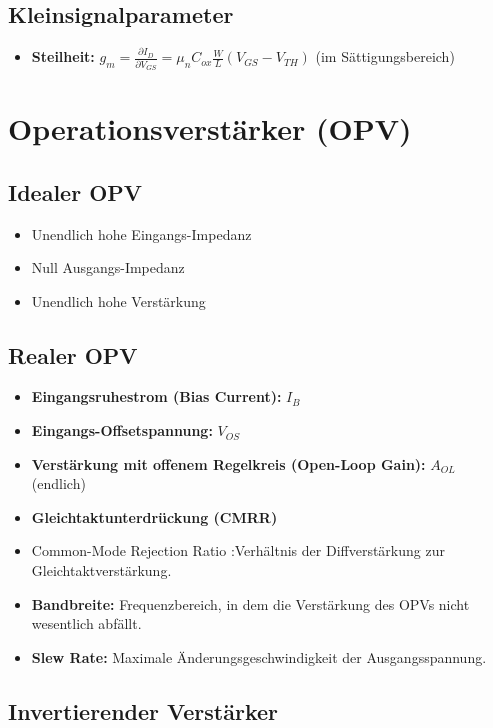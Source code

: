 \documentclass{article}
\begin{document}
\subsection*{Kleinsignalparameter}
\begin{itemize}
    \item \textbf{Steilheit:} $g_m = \frac{\partial I_D}{\partial V_{GS}} = \mu_n C_{ox} \frac{W}{L} (V_{GS} - V_{TH})$ (im Sättigungsbereich)
\end{itemize}

\section*{Operationsverstärker (OPV)}

\subsection*{Idealer OPV}
\begin{itemize}
    \item Unendlich hohe Eingangs-Impedanz
    \item Null Ausgangs-Impedanz
    \item Unendlich hohe Verstärkung
\end{itemize}

\subsection*{Realer OPV}
\begin{itemize}
    \item \textbf{Eingangsruhestrom (Bias Current):} $I_B$
    \item \textbf{Eingangs-Offsetspannung:} $V_{OS}$
    \item \textbf{Verstärkung mit offenem Regelkreis (Open-Loop Gain):} $A_{OL}$ (endlich)
    \item \textbf{Gleichtaktunterdrückung (CMRR)} 
    \item Common-Mode Rejection Ratio :Verhältnis der Diffverstärkung zur Gleichtaktverstärkung.
    \item \textbf{Bandbreite:} Frequenzbereich, in dem die Verstärkung des OPVs nicht wesentlich abfällt.
    \item \textbf{Slew Rate:} Maximale Änderungsgeschwindigkeit der Ausgangsspannung.
\end{itemize}


\subsection*{Invertierender Verstärker}
\end{document}
